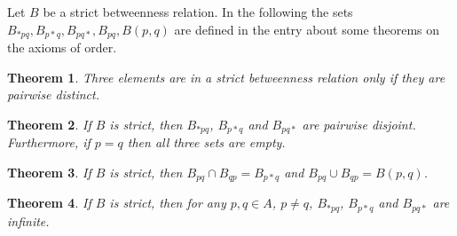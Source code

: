 \documentclass[12pt]{article}
\newtheorem{thm}{Theorem}
\begin{document}
Let $B$ be a strict betweenness relation. In the following the sets $B_{*pq}, B_{p*q}, B_{pq*}, B_{pq}, B(p,q)$
are defined in the  entry about   some theorems on the axioms of order.

\begin{thm}
Three elements are
in a strict betweenness relation only if they are pairwise distinct.
\end{thm}
\begin{thm}
If $B$ is strict, then $B_{*pq}$, $B_{p*q}$ and $B_{pq*}$ are pairwise disjoint.  
Furthermore, if $p=q$ then all three sets are empty.
\end{thm}
\begin{thm} 
If $B$ is strict, then $B_{pq}\cap B_{qp}=B_{p*q}$ and $B_{pq}\cup B_{qp}=B(p,q)$.
\end{thm}
\begin{thm} 
If $B$ is strict, then for any $p,q\in A$, $p\ne q$, $B_{*pq}$, $B_{p*q}$ and $B_{pq*}$ are infinite.
\end{thm}
\end{document}

